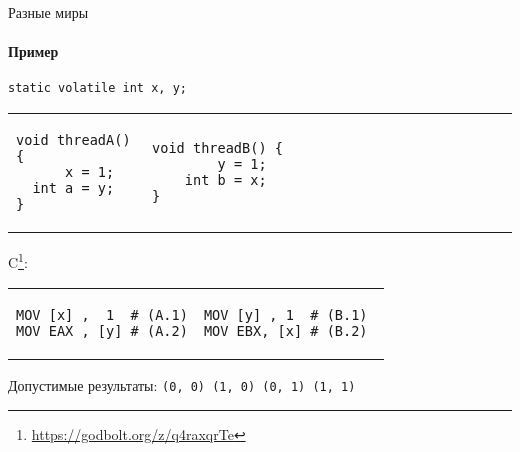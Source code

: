 \begin{frame}[fragile, t]{Разные миры}
\framesubtitle{Пример}



\begin{verbatim}
static volatile int x, y;
\end{verbatim}

\begin{tabular}{p{} p{}}

\begin{verbatim}
void threadA() {
      x = 1;
  int a = y;
}
\end{verbatim}

& 

\begin{verbatim}
void threadB() {                                   
        y = 1;                           
    int b = x;                           
}                    
\end{verbatim}
\end{tabular}

\pause
\vspace{-0.5cm}
C\footnote<2->{\tiny\url{https://godbolt.org/z/q4raxqrTe}}:

\begin{tabular}{p{} p{}}
\begin{verbatim}
MOV [x] ,  1  # (A.1)
MOV EAX , [y] # (A.2)
\end{verbatim}

& 

\begin{verbatim}
MOV [y] , 1  # (B.1) 
MOV EBX, [x] # (B.2) 
\end{verbatim}
\end{tabular}

\pause
Допустимые результаты: \texttt{(0, 0) (1, 0) (0, 1) (1, 1)}
\end{frame}

